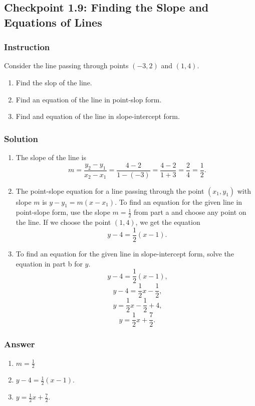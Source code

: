 \subsection*{Checkpoint 1.9: Finding the Slope and Equations of Lines}

\subsubsection*{Instruction}

Consider the line passing through points  $ (-3,2) $ and  $ (1,4) $.

\begin{enumerate}[label = (\alph*)]
  \item
    Find the slop of the line.
  \item
    Find an equation of the line in point-slop form.
  \item
    Find and equation of the line in slope-intercept form.
\end{enumerate}

\subsubsection*{Solution}

\begin{enumerate}[label = (\alph*)]
  \item
    The slope of the line is
    $$ \phantom{.}
    m = \frac{y_2 - y_1}{x_2 - x_1} = \frac{4 - 2}{1 - (-3)} = \frac{4 - 2}{1 + 3} = \frac{2}{4} = \frac{1}{2}
    .$$
  \item The point-slope equation for a line passing through the point $ (x_1, y_1) $ with slope $ m $ is $ y - y_1 = m(x - x_1) $. To find an equation for the given line in point-slope form, use the slope $ m = \frac{1}{2} $ from part a and choose any point on the line. If we choose the point $ (1, 4) $, we get the equation
    $$ \phantom{.}
    y - 4 = \frac{1}{2}(x - 1)
    .$$
  \item To find an equation for the given line in slope-intercept form, solve the equation in part b for $ y $.
    $$ \phantom{,}
    y - 4 = \frac{1}{2}(x - 1)
    ,$$
    $$ \phantom{,}
    y - 4 = \frac{1}{2}x - \frac{1}{2}
    ,$$
    $$ \phantom{,}
    y = \frac{1}{2}x - \frac{1}{2} + 4
    ,$$
    $$ \phantom{.}
    y = \frac{1}{2}x + \frac{7}{2}
    .$$
\end{enumerate}

\subsubsection{Answer}

\begin{enumerate}[label = (\alph*)]
  \item
    $ m = \frac{1}{2} $
  \item
    $ y - 4 = \frac{1}{2}(x - 1) $.
  \item
    $ y = \frac{1}{2}x + \frac{7}{2} $.
\end{enumerate}
